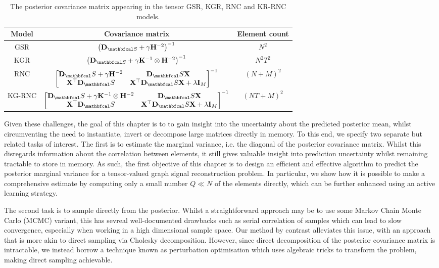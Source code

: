 \begin{table}[ht]
    \def\arraystretch{1.5}
    \centering
    \begin{tabular}{|c|c|c|}
    \hline
    \textbf{Model} & \textbf{Covariance matrix} & \textbf{Element count}\\
    \hline
    GSR & $\left(\D_{\St} + \gamma \HH^{-2}\right)^{-1}$ & $ N^2 $\\ 
    \hline
    KGR & $\left(\D_{\St} + \gamma \K^{-1} \otimes \HH^{-2}\right)^{-1}$ & $N^2T^2$\\ 
    \hline
    RNC & $\begin{bmatrix}
        \D_\St + \gamma \HH^{-2} & \D_\St  \X \\
        \X^\top \D_\St & \X^\top \D_\St \X + \lambda \I_M   
       \end{bmatrix}^{-1}$ & $(N + M)^2$ \\ 
    \hline
    KG-RNC & $\begin{bmatrix}
        \D_\St + \gamma \K^{-1} \otimes \HH^{-2} & \D_\St  \X \\
        \X^\top \D_\St & \X^\top \D_\St \X + \lambda \I_M   
       \end{bmatrix}^{-1}$ & $(NT + M)^2$ \\
    \hline
\end{tabular}
\caption{The posterior covariance matrix appearing in the tensor GSR, KGR, RNC and KR-RNC models.}
\label{tab:post_cov}
\end{table}


Given these challenges, the goal of this chapter is to to gain insight into the uncertainty about the predicted posterior mean, whilst circumventing the need to instantiate, invert or decompose large matrices directly in memory. To this end, we specify two separate but related tasks of interest. The first is to estimate the marginal variance, i.e. the diagonal of the posterior covariance matrix. Whilst this disregards information about the correlation between elements, it still gives valuable insight into prediction uncertainty whilst remaining tractable to store in memory. As such, the first objective of this chapter is to design an efficient and effective algorithm to predict the posterior marginal variance for a tensor-valued graph signal reconstruction problem. In particular, we show how it is possible to make a comprehensive estimate by computing only a small number $Q \ll N$ of the elements directly, which can be further enhanced using an active learning strategy. 

The second task is to sample directly from the posterior. Whilst a straightforward approach may be to use some Markov Chain Monte Carlo (MCMC) variant, this has sevreal well-documented drawbacks such as serial correlation of samples which can lead to slow convergence, especially when working in a high dimensional sample space. Our method by contrast alleviates this issue, with an approach that is more akin to direct sampling via Cholesky decomposition. However, since direct decomposition of the posterior covariance matrix is intractable, we instead borrow a technique known as perturbation optimisation which uses algebraic tricks to transform the problem, making direct sampling achievable. 

